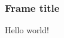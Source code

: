 \documentclass{beamer}
\begin{document}
\begin{frame}
\frametitle{Frame title}
Hello world!
\end{frame}
\end{document}
